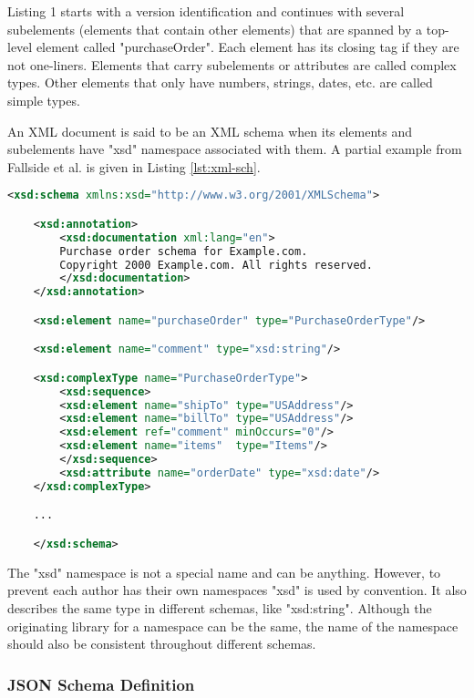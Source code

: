 Listing 1 starts with a version identification and continues with several
subelements (elements that contain other elements) that are spanned by a
top-level element called "purchaseOrder". Each element has its closing tag if
they are not one-liners. Elements that carry subelements or attributes are
called complex types. Other elements that only have numbers, strings, dates,
etc. are called simple types.

An XML document is said to be an XML schema when its elements and subelements
have "xsd" namespace associated with them. A partial example from Fallside et
al. is given in Listing \ref{lst:xml-sch}.

\begin{lstlisting}[language = XML, caption = {A partial XML schema for a home products ordering and billing application.}, captionpos = b, label = lst:xml-sch]
    <xsd:schema xmlns:xsd="http://www.w3.org/2001/XMLSchema">

    <xsd:annotation>
        <xsd:documentation xml:lang="en">
        Purchase order schema for Example.com.
        Copyright 2000 Example.com. All rights reserved.
        </xsd:documentation>
    </xsd:annotation>

    <xsd:element name="purchaseOrder" type="PurchaseOrderType"/>

    <xsd:element name="comment" type="xsd:string"/>

    <xsd:complexType name="PurchaseOrderType">
        <xsd:sequence>
        <xsd:element name="shipTo" type="USAddress"/>
        <xsd:element name="billTo" type="USAddress"/>
        <xsd:element ref="comment" minOccurs="0"/>
        <xsd:element name="items"  type="Items"/>
        </xsd:sequence>
        <xsd:attribute name="orderDate" type="xsd:date"/>
    </xsd:complexType>

    ...

    </xsd:schema>

\end{lstlisting}

The "xsd" namespace is not a special name and can be anything. However, to
prevent each author has their own namespaces "xsd" is used by convention. It
also describes the same type in different schemas, like "xsd:string". Although
the originating library for a namespace can be the same, the name of the
namespace should also be consistent throughout different schemas.

\subsubsection{JSON Schema Definition}